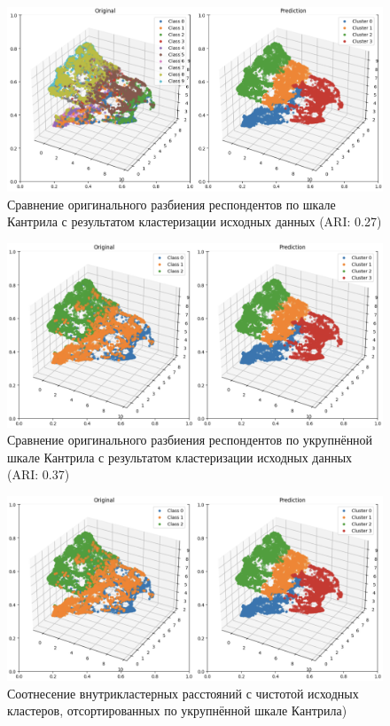 \begin{figure}
	\begin{center}
		\includegraphics[width=\textwidth]{images/6.png}
	\end{center}
	\caption{Сравнение оригинального разбиения респондентов по шкале Кантрила с результатом кластеризации исходных данных (ARI: 0.27)}
	\label{img:5}
\end{figure}

\begin{figure}
	\begin{center}
		\includegraphics[width=\textwidth]{images/7.png}
	\end{center}
	\caption{Сравнение оригинального разбиения респондентов по укрупнённой шкале Кантрила с результатом кластеризации исходных данных (ARI: 0.37)}
	\label{img:6}
\end{figure}

\begin{figure}
	\begin{center}
		\includegraphics[width=\textwidth]{images/7.png}
	\end{center}
	\caption{Соотнесение внутрикластерных расстояний с чистотой исходных кластеров, отсортированных по укрупнённой шкале Кантрила)}
	\label{img:7}
\end{figure}

